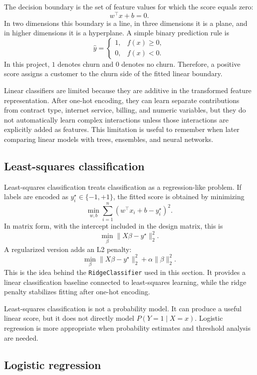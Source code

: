 The decision boundary is the set of feature values for which the score equals zero:
\[
w^\top x + b = 0.
\]
In two dimensions this boundary is a line, in three dimensions it is a plane, and in higher dimensions it is a hyperplane. A simple binary prediction rule is
\[
\hat{y}
=
\begin{cases}
1, & f(x) \geq 0,\\
0, & f(x) < 0.
\end{cases}
\]
In this project, \(1\) denotes churn and \(0\) denotes no churn. Therefore, a positive score assigns a customer to the churn side of the fitted linear boundary.

Linear classifiers are limited because they are additive in the transformed feature representation. After one-hot encoding, they can learn separate contributions from contract type, internet service, billing, and numeric variables, but they do not automatically learn complex interactions unless those interactions are explicitly added as features. This limitation is useful to remember when later comparing linear models with trees, ensembles, and neural networks.

\subsection{Least-squares classification}

Least-squares classification treats classification as a regression-like problem. If labels are encoded as \(y_i^\star \in \{-1,+1\}\), the fitted score is obtained by minimizing
\[
\min_{w,b}
\sum_{i=1}^n
\left(
w^\top x_i + b - y_i^\star
\right)^2.
\]
In matrix form, with the intercept included in the design matrix, this is
\[
\min_\beta \|X\beta - y^\star\|_2^2.
\]
A regularized version adds an L2 penalty:
\[
\min_\beta \|X\beta - y^\star\|_2^2 + \alpha \|\beta\|_2^2.
\]
This is the idea behind the \texttt{RidgeClassifier} used in this section. It provides a linear classification baseline connected to least-squares learning, while the ridge penalty stabilizes fitting after one-hot encoding.

Least-squares classification is not a probability model. It can produce a useful linear score, but it does not directly model \(P(Y=1 \mid X=x)\). Logistic regression is more appropriate when probability estimates and threshold analysis are needed.

\subsection{Logistic regression}


